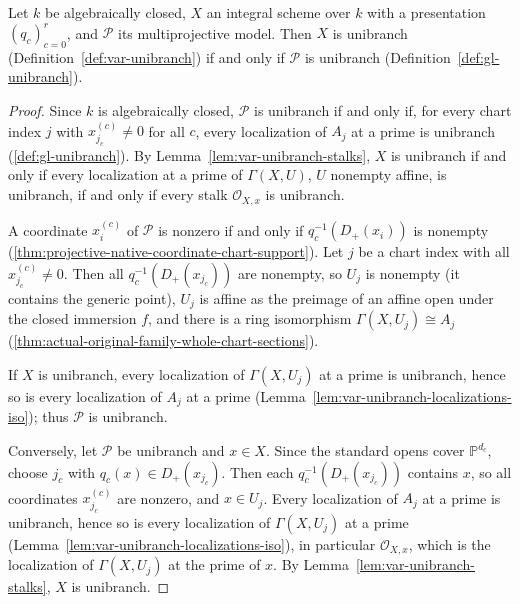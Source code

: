 \begin{theorem}\label{thm:var-unibranch-presentation}
\leanok
{}
Let $k$ be algebraically closed, $X$ an integral scheme over $k$ with a presentation
$(q_c)_{c=0}^r$, and $\mathcal P$ its multiprojective model. Then $X$ is unibranch
(Definition~\ref{def:var-unibranch}) if and only if $\mathcal P$ is unibranch
(Definition~\ref{def:gl-unibranch}).
\end{theorem}

\begin{proof}
Since $k$ is algebraically closed, $\mathcal P$ is unibranch if and only if, for every chart
index $j$ with $x^{(c)}_{j_c}\neq0$ for all $c$, every localization of $A_j$ at a prime is
unibranch (\ref{def:gl-unibranch}). By Lemma~\ref{lem:var-unibranch-stalks}, $X$ is unibranch if
and only if every localization at a prime of $\Gamma(X,U)$, $U$ nonempty affine, is unibranch,
if and only if every stalk $\mathcal O_{X,x}$ is unibranch.

A coordinate $x^{(c)}_i$ of $\mathcal P$ is nonzero if and only if $q_c^{-1}(D_+(x_i))$ is
nonempty (\ref{thm:projective-native-coordinate-chart-support}). Let $j$ be a chart index with all
$x^{(c)}_{j_c}\neq0$. Then all $q_c^{-1}(D_+(x_{j_c}))$ are nonempty, so $U_j$ is nonempty
(it contains the generic point), $U_j$ is affine as the preimage of an affine open under the
closed immersion $f$, and there is a ring isomorphism $\Gamma(X,U_j)\cong A_j$
(\ref{thm:actual-original-family-whole-chart-sections}).

If $X$ is unibranch, every localization of $\Gamma(X,U_j)$ at a prime is unibranch, hence so is
every localization of $A_j$ at a prime (Lemma~\ref{lem:var-unibranch-localizations-iso}); thus
$\mathcal P$ is unibranch.

Conversely, let $\mathcal P$ be unibranch and $x\in X$. Since the standard opens cover
$\mathbb P^{d_c}$, choose $j_c$ with $q_c(x)\in D_+(x_{j_c})$. Then each
$q_c^{-1}(D_+(x_{j_c}))$ contains $x$, so all coordinates $x^{(c)}_{j_c}$ are nonzero, and
$x\in U_j$. Every localization of $A_j$ at a prime is unibranch, hence so is every localization of
$\Gamma(X,U_j)$ at a prime (Lemma~\ref{lem:var-unibranch-localizations-iso}), in particular
$\mathcal O_{X,x}$, which is the localization of $\Gamma(X,U_j)$ at the prime of $x$. By
Lemma~\ref{lem:var-unibranch-stalks}, $X$ is unibranch.
\end{proof}
